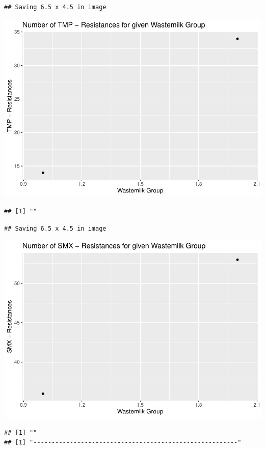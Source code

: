 \documentclass[
]{article}
\begin{document}
\begin{verbatim}
## Saving 6.5 x 4.5 in image
\end{verbatim}

\includegraphics{NResistenzen_files/figure-latex/binary_or_nominal_variables-9.pdf}

\begin{verbatim}
## [1] ""
\end{verbatim}

\begin{verbatim}
## Saving 6.5 x 4.5 in image
\end{verbatim}

\includegraphics{NResistenzen_files/figure-latex/binary_or_nominal_variables-10.pdf}

\begin{verbatim}
## [1] ""
## [1] "--------------------------------------------------------"
\end{verbatim}
\end{document}
